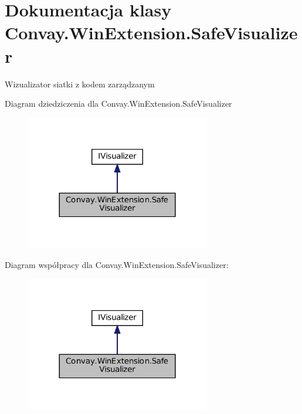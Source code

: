 \hypertarget{class_convay_1_1_win_extension_1_1_safe_visualizer}{}\section{Dokumentacja klasy Convay.\+Win\+Extension.\+Safe\+Visualizer}
\label{class_convay_1_1_win_extension_1_1_safe_visualizer}


Wizualizator siatki z kodem zarządzanym  




Diagram dziedziczenia dla Convay.\+Win\+Extension.\+Safe\+Visualizer
\nopagebreak
\begin{figure}[H]
\begin{center}
\leavevmode
\includegraphics[width=228pt]{class_convay_1_1_win_extension_1_1_safe_visualizer__inherit__graph}
\end{center}
\end{figure}


Diagram współpracy dla Convay.\+Win\+Extension.\+Safe\+Visualizer\+:
\nopagebreak
\begin{figure}[H]
\begin{center}
\leavevmode
\includegraphics[width=228pt]{class_convay_1_1_win_extension_1_1_safe_visualizer__coll__graph}
\end{center}
\end{figure}

